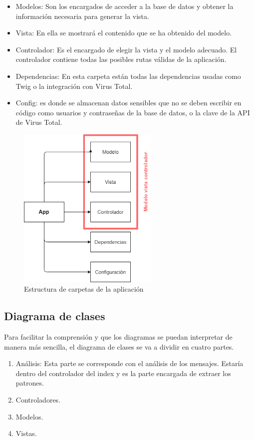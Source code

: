 \begin{itemize}
    \item Modelos: Son los encargados de acceder a la base de datos y obtener la información necesaria para generar la vista. 
    \item Vista: En ella se mostrará el contenido que se ha obtenido del modelo. 
    \item Controlador: Es el encargado de elegir la vista y el modelo adecuado.
    El controlador contiene todas las posibles rutas válidas de la aplicación. 
    \item Dependencias: En esta carpeta están todas las dependencias usadas como Twig o la integración con Virus Total.
    \item Config: es donde se almacenan datos sensibles que no se deben escribir en código como usuarios y contraseñas de la base de datos, o la clave de la API de Virus Total.  
\end{itemize}

\begin{figure}[htb]
    \centering
    \includegraphics[width=0.6\textwidth]{imagenes/Estructura_carpetas.png}
\caption{Estructura de carpetas de la aplicación}
\label{fig:estructuraCarpetas}
\end{figure}

\subsection{Diagrama de clases}
Para facilitar la comprensión y que los diagramas se puedan interpretar de manera más sencilla, el diagrama de clases se va a dividir en cuatro partes. 
\begin{enumerate}
    \item Análisis: Esta parte se corresponde con el análisis de los mensajes. Estaría dentro del controlador del index y es la parte encargada de extraer los patrones.
    \item Controladores.
    \item Modelos.
    \item Vistas.
\end{enumerate}
